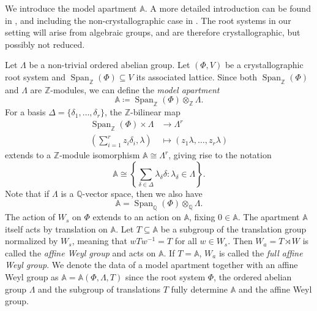 \documentclass[12pt]{amsart}
\newcommand{\Q}{\mathbb{Q} }
\newcommand{\Z}{\mathbb{Z} }
\newcommand{\A}{\mathbb{A}}
\numberwithin{equation}{section}
\theoremstyle{remark} %
\begin{document}
	
	We introduce the model apartment $\A$. A more detailed introduction can be found in \cite{Ben1}, and including the non-crystallographic case in \cite{Sch09}. The root systems in our setting will arise from algebraic groups, and are therefore crystallographic, but possibly not reduced.
	
	Let $\Lambda$ be a non-trivial ordered abelian group. %
	 Let $(\Phi,V)$ be a crystallographic root system and $\operatorname{Span}_{\Z}(\Phi) \subseteq V$ its associated lattice. %
	Since both $\operatorname{Span}_{\Z}(\Phi)$ and $\Lambda$ are $\Z$-modules, we can define the \emph{model apartment} 
	$$
	\A \coloneqq \operatorname{Span}_{\Z}(\Phi) \otimes_{\Z} \Lambda .
	$$
	For a basis $\Delta = \{\delta_1 , \ldots , \delta_r \}$, the $\mathbb{Z}$-bilinear map
	\begin{align*}
		\operatorname{Span}_{\Z}(\Phi) \times \Lambda & \to \Lambda^{r} \\
		\left(\sum_{i=1}^r z_i \delta_i , \lambda \right)& \mapsto (z_1 \lambda, \ldots , z_r \lambda)
	\end{align*}
    extends to a $\mathbb{Z}$-module isomorphism
	$
	\A %
	\cong \Lambda^{r}
	$, giving rise to the notation
	$$
	\A \cong \left\{ \sum_{\delta \in \Delta} \lambda_\delta \delta \colon \lambda_\delta \in \Lambda \right\}.
	$$
	Note that if $\Lambda$ is a $\Q$-vector space, then we also have
	$$
	\A = \operatorname{Span}_\Q(\Phi) \otimes_{\Q} \Lambda.
	$$
	 The action of $W_s$ on $\Phi$ extends to an action on $\A$, fixing $0 \in \A$. The apartment $\A$ itself acts by translation on $\A$. Let $T\subseteq \A$ be a subgroup of the translation group normalized by $W_s$, meaning that $wTw^{-1} = T$ for all $w\in W_s$. Then $W_a = T \rtimes W $ is called the \emph{affine Weyl group} and acts on $\A$. If $T=\A$, $W_a$ is called the \emph{full affine Weyl group}. We denote the data of a model apartment together with an affine Weyl group as $\A = \A(\Phi,\Lambda,T)$ since the root system $\Phi$, the ordered abelian group $\Lambda$ and the subgroup of translations $T$ fully determine $\A$ and the affine Weyl group. 
	 
	 
\end{document}
